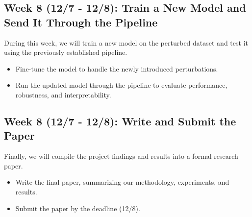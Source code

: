 \subsection*{Week 8 (12/7 - 12/8): Train a New Model and Send It Through the Pipeline}
During this week, we will train a new model on the perturbed dataset and test it using the previously established pipeline.
\begin{itemize}
    \item Fine-tune the model to handle the newly introduced perturbations.
    \item Run the updated model through the pipeline to evaluate performance, robustness, and interpretability.
\end{itemize}

\subsection*{Week 8 (12/7 - 12/8): Write and Submit the Paper}
Finally, we will compile the project findings and results into a formal research paper.
\begin{itemize}
    \item Write the final paper, summarizing our methodology, experiments, and results.
    \item Submit the paper by the deadline (12/8).
\end{itemize}